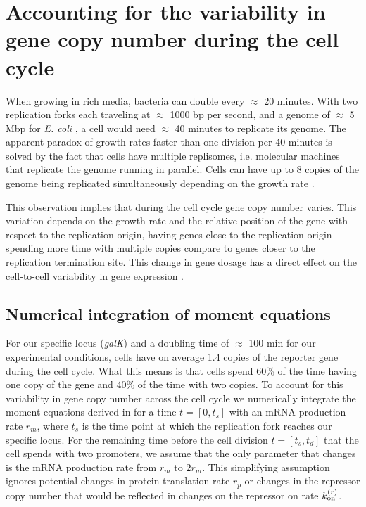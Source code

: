 \section{Accounting for the variability in gene copy number during the cell
cycle} \label{supp_multi_gene}

When growing in rich media, bacteria can double every $\approx$ 20 minutes. With
two replication forks each traveling at $\approx$ 1000 bp per second, and a
genome of $\approx$ 5 Mbp for {\it E. coli} \cite{Moran2010}, a cell would need
$\approx$ 40 minutes to replicate its genome. The apparent paradox  of growth
rates faster than one division per 40 minutes is solved by the fact that cells
have multiple replisomes, i.e. molecular machines that replicate the genome
running in parallel. Cells can have up to 8 copies of the genome being
replicated simultaneously depending on the growth rate \cite{Bremer1996}.

This observation implies that during the cell cycle gene copy number varies.
This variation depends on the growth rate and the relative position of the gene
with respect to the replication origin, having genes close to the replication
origin spending more time with multiple copies compare to genes closer to the
replication termination site. This change in gene dosage has a direct effect on
the cell-to-cell variability in gene expression \cite{Jones2014a, Peterson2015}.

\subsection{Numerical integration of moment equations}

For our specific locus ({\it galK}) and a doubling time of $\approx$ 100 min for
our experimental conditions, cells have on average 1.4 copies of the reporter
gene during the cell cycle. What this means is that cells spend 60\% of the time
having one copy of the gene and 40\% of the time with two copies. To account for
this variability in gene copy number across the cell cycle we numerically
integrate the moment equations derived in  for a time $t =
[0, t_s]$ with an mRNA production rate $r_m$, where $t_s$ is the time point at
which the replication fork reaches our specific locus. For the remaining time
before the cell division $t = [t_s, t_d]$ that the cell spends with two
promoters, we assume that the only parameter that changes is the mRNA production
rate from $r_m$ to $2 r_m$. This simplifying assumption ignores potential
changes in protein translation rate $r_p$ or changes in the repressor copy
number that would be reflected in changes on the repressor on rate $k^{(r)}_{\text{on}}$.

